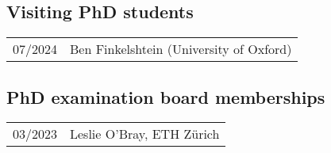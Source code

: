 \documentclass[11pt, a4paper, DIV=14, headings=small]{scrartcl}
\begin{document}
	\subsection*{Visiting PhD students}
\begin{longtabu}{p{2.1cm}p{12.0cm}}
	07/2024 & Ben Finkelshtein (University of Oxford) \\
\end{longtabu}
	
	\subsection*{PhD examination board memberships}
	\begin{longtabu}{p{2.1cm}p{12.0cm}}
		03/2023 &  Leslie O'Bray, ETH Zürich \\
	\end{longtabu}
	
\end{document}

